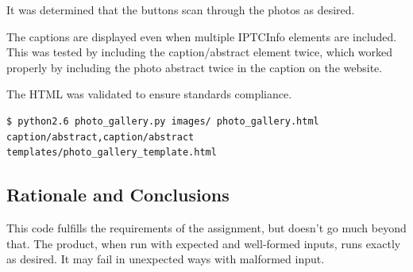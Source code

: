 \documentclass[11pt,letterpaper]{article}
\begin{document}
It was determined that the buttons scan through the photos as desired.

The captions are displayed even when multiple IPTCInfo elements are included. This was tested by including the caption/abstract element twice, which worked properly by including the photo abstract twice in the caption on the website.

The HTML was validated to ensure standards compliance.
\begin{verbatim}
$ python2.6 photo_gallery.py images/ photo_gallery.html caption/abstract,caption/abstract 
templates/photo_gallery_template.html
\end{verbatim}

\subsection{Rationale and Conclusions}
This code fulfills the requirements of the assignment, but doesn't go much beyond that. The product, when run with expected and well-formed inputs, runs exactly as desired. It may fail in unexpected ways with malformed input.
\end{document}

